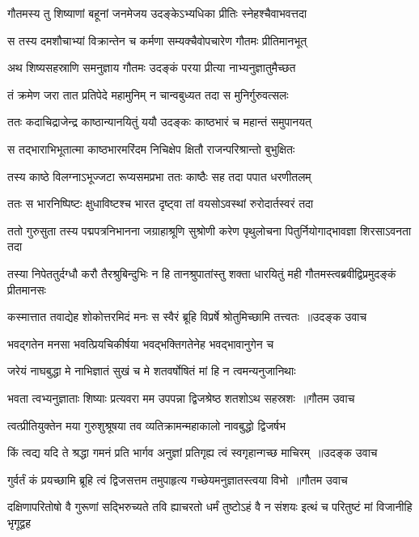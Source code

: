 \twolineshloka
{गौतमस्य तु शिष्याणां बहूनां जनमेजय}
{उदङ्केऽभ्यधिका प्रीतिः स्नेहश्चैवाभवत्तदा}


\twolineshloka
{स तस्य दमशौचाभ्यां विक्रान्तेन च कर्मणा}
{सम्यक्चैवोपचारेण गौतमः प्रीतिमानभूत्}


\twolineshloka
{अथ शिष्यसहस्राणि समनुज्ञाय गौतमः}
{उदङ्कं परया प्रीत्या नाभ्यनुज्ञातुमैच्छत}


\twolineshloka
{तं क्रमेण जरा तात प्रतिपेदे महामुनिम्}
{न चान्वबुध्यत तदा स मुनिर्गुरुवत्सलः}


\twolineshloka
{ततः कदाचिद्राजेन्द्र काष्ठान्यानयितुं ययौ}
{उदङ्कः काष्ठभारं च महान्तं समुपानयत्}


\twolineshloka
{स तद्भाराभिभूतात्मा काष्ठभारमरिंदम}
{निचिक्षेप क्षितौ राजन्परिश्रान्तो बुभुक्षितः}


\twolineshloka
{तस्य काष्ठे विलग्नाऽभूज्जटा रूप्यसमप्रभा}
{ततः काष्ठैः सह तदा पपात धरणीतलम्}


\twolineshloka
{ततः स भारनिष्पिष्टः क्षुधाविष्टश्च भारत}
{दृष्ट्वा तां वयसोऽवस्थां रुरोदार्तस्वरं तदा}


\threelineshloka
{ततो गुरुसुता तस्य पद्मपत्रनिभानना}
{जग्राहाश्रूणि सुश्रोणी करेण पृथुलोचना}
{पितुर्नियोगाद्भावज्ञा शिरसाऽवनता तदा}


\threelineshloka
{तस्या निपेततुर्दग्धौ करौ तैरश्रुबिन्दुभिः}
{न हि तानश्रुपातांस्तु शक्ता धारयितुं मही}
{गौतमस्त्वब्रवीद्विप्रमुदङ्कं प्रीतमानसः}


\threelineshloka
{कस्मात्तात तवाद्येह शोकोत्तरमिदं मनः}
{स स्वैरं ब्रूहि विप्रर्षे श्रोतुमिच्छामि तत्त्वतः ॥उदङ्क उवाच}
{}


\twolineshloka
{भवद्गतेन मनसा भवत्प्रियचिकीर्षया}
{भवद्भक्तिगतेनेह भवद्भावानुगेन च}


\twolineshloka
{जरेयं नाघबुद्धा मे नाभिज्ञातं सुखं च मे}
{शतवर्षोषितं मां हि न त्वमन्यनुजानिथाः}


\threelineshloka
{भवता त्वभ्यनुज्ञाताः शिष्याः प्रत्यवरा मम}
{उपपन्ना द्विजश्रेष्ठ शतशोऽथ सहस्रशः ॥गौतम उवाच}
{}


\twolineshloka
{त्वत्प्रीतियुक्तेन मया गुरुशुश्रूषया तव}
{व्यतिक्रामन्महाकालो नावबुद्धो द्विजर्षभ}


\threelineshloka
{किं त्वद्य यदि ते श्रद्धा गमनं प्रति भार्गव}
{अनुज्ञां प्रतिगृह्य त्वं स्वगृहान्गच्छ माचिरम् ॥उदङ्क उवाच}
{}


\threelineshloka
{गुर्वर्तं कं प्रयच्छामि ब्रूहि त्वं द्विजसत्तम}
{तमुपाहृत्य गच्छेयमनुज्ञातस्त्वया विभो ॥गौतम उवाच}
{}


\threelineshloka
{दक्षिणापरितोषो वै गुरूणां सद्भिरुच्यते}
{तवि ह्याचरतो धर्मं तुष्टोऽहं वै न संशयः}
{इत्थं च परितुष्टं मां विजानीहि भृगूद्वह}


